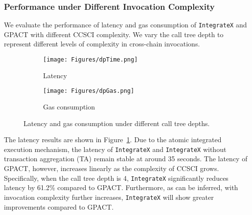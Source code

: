 \subsubsection{Performance under Different Invocation Complexity}
We evaluate the performance of latency and gas consumption of \texttt{IntegrateX} and GPACT with different CCSCI complexity.
We vary the call tree depth to represent different levels of complexity in cross-chain invocations.

\begin{figure}[t]
    \centering
    \begin{subfigure}[b]{0.24\textwidth}
        \centering
        \texttt{[image: Figures/dpTime.png]}  %
        \caption{Latency}
        \label{dptime}
    \end{subfigure}
    \hfill
    \begin{subfigure}[b]{0.24\textwidth}
        \centering
        \texttt{[image: Figures/dpGas.png]}  %
        \caption{Gas consumption}
        \label{dpgas}  %
    \end{subfigure}   
    \vspace{-18pt}
    \caption{Latency and gas consumption under different call tree depths.}
    \label{depth}  %

\end{figure}

The latency results are shown in Figure~\ref{dptime}. Due to the atomic integrated execution mechanism, the latency of \texttt{IntegrateX} and \texttt{IntegrateX} without transaction aggregation (TA) remain stable at around 35 seconds. 
The latency of GPACT, however, increases linearly as the complexity of CCSCI grows.
Specifically, when the call tree depth is 4, \texttt{IntegrateX} significantly reduces latency by 61.2\% compared to GPACT. 
Furthermore, as can be inferred, with invocation complexity further increases, \texttt{IntegrateX} will show greater improvements compared to GPACT. 

